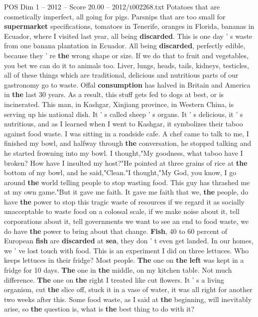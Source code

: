 \begin{textsample}{POS Dim 1 – 2012 – Score 20.00 – 2012/t002268.txt}
Potatoes that are cosmetically imperfect, all going for pigs.
Parsnips that are too small for \textbf{supermarket} specifications, tomatoes in Tenerife, oranges in Florida, bananas in Ecuador, where I visited last year, all being \textbf{discarded}.
This is one day ' s waste from one banana plantation in Ecuador.
All being \textbf{discarded}, perfectly edible, because they ' re \textbf{the} wrong shape or size.
If we do that to fruit and vegetables, you bet we can do it to animals too.
Liver, lungs, heads, tails, kidneys, testicles, all of these things which are traditional, delicious and nutritious parts of our gastronomy go to waste.
Offal \textbf{consumption} has halved in Britain and America in \textbf{the} last 30 years.
As a result, this stuff gets fed to dogs at best, or is incinerated.
This man, in Kashgar, Xinjiang province, in Western China, is serving up his national dish.
It ' s called sheep ' s organs.
It ' s delicious, it ' s nutritious, and as I learned when I went to Kashgar, it symbolizes their taboo against food waste.
I was sitting in a roadside cafe.
A chef came to talk to me, I finished my bowl, and halfway through \textbf{the} conversation, he stopped talking and he started frowning into my bowl.
I thought,"My goodness, what taboo have I broken?
How have I insulted my host?"He pointed at three grains of rice at \textbf{the} bottom of my bowl, and he said,"Clean."I thought,"My God, you know, I go around \textbf{the} world telling people to stop wasting food.
This guy has thrashed me at my own game."But it gave me faith.
It gave me faith that we, \textbf{the} people, do have \textbf{the} power to stop this tragic waste of resources if we regard it as socially unacceptable to waste food on a colossal scale, if we make noise about it, tell corporations about it, tell governments we want to see an end to food waste, we do have \textbf{the} power to bring about that change. \textbf{Fish}, 40 to 60 percent of European \textbf{fish} are \textbf{discarded} at \textbf{sea}, they don ' t even get landed.
In our homes, we ' ve lost touch with food.
This is an experiment I did on three lettuces.
Who keeps lettuces in their fridge?
Most people. \textbf{The} one on \textbf{the} \textbf{left} was kept in a fridge for 10 days. \textbf{The} one in \textbf{the} middle, on my kitchen table.
Not much difference. \textbf{The} one on \textbf{the} right I treated like cut flowers.
It ' s a living organism, cut \textbf{the} slice off, stuck it in a vase of water, it was all right for another two weeks after this.
Some food waste, as I said at \textbf{the} beginning, will inevitably arise, so \textbf{the} question is, what is \textbf{the} best thing to do with it?

\end{textsample}
